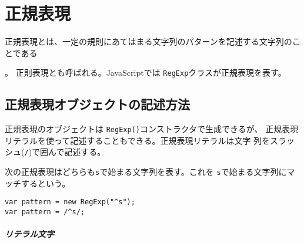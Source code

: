 \chapter{正規表現}
正規表現とは、一定の規則にあてはまる文字列のパターンを記述する文字列のこ
とである
\iffalse%
同等のものであったが、最近の計算機言語で取り扱う正則言語は機能が拡張され、
正則言語より広い範囲の形式言語を記述することが可能となっている。}
\fi
。
正則表現とも呼ばれる。JavaScriptでは
\texttt{RegExp}クラスが正規表現を表す。
\section{正規表現オブジェクトの記述方法}
正規表現のオブジェクトは \texttt{RegExp()}コンストラクタで生成できるが、
正規表現リテラルを使って記述することもできる。正規表現リテラルは文字
列をスラッシュ(\texttt{/})で囲んで記述する。

次の正規表現はどちらも\texttt{s}で始まる文字列を表す。これを
\texttt{s}で始まる文字列にマッチするという。
\begin{Verbatim}
var pattern = new RegExp("^s");
var pattern = /^s/;
\end{Verbatim}
\iffalse%
正規表現内の文字には通常の文
字(ここでは\texttt{s})を表すものと、特別な意味を持つ文字(ここでは
\Verb+^+)がある。特別な意味を持つ文字はメタ文字と呼ばれる。
\fi
\paragraph{リテラル文字}

